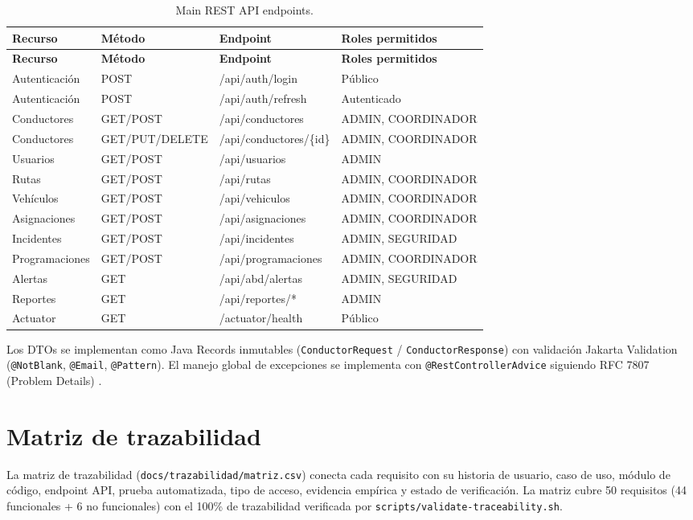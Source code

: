 \begin{longtable}{@{}p{3.5cm}p{2cm}p{2.5cm}p{2.5cm}@{}}
\caption{Main REST API endpoints.}
\label{tab:api-rest}\\
\toprule
\textbf{Recurso} & \textbf{Método} & \textbf{Endpoint} & \textbf{Roles permitidos} \\
\midrule
\endfirsthead
\toprule
\textbf{Recurso} & \textbf{Método} & \textbf{Endpoint} & \textbf{Roles permitidos} \\
\midrule
\endhead
Autenticación & POST & /api/auth/login & Público \\
Autenticación & POST & /api/auth/refresh & Autenticado \\
Conductores & GET/POST & /api/conductores & ADMIN, COORDINADOR \\
Conductores & GET/PUT/DELETE & /api/conductores/\{id\} & ADMIN, COORDINADOR \\
Usuarios & GET/POST & /api/usuarios & ADMIN \\
Rutas & GET/POST & /api/rutas & ADMIN, COORDINADOR \\
Vehículos & GET/POST & /api/vehiculos & ADMIN, COORDINADOR \\
Asignaciones & GET/POST & /api/asignaciones & ADMIN, COORDINADOR \\
Incidentes & GET/POST & /api/incidentes & ADMIN, SEGURIDAD \\
Programaciones & GET/POST & /api/programaciones & ADMIN, COORDINADOR \\
Alertas & GET & /api/abd/alertas & ADMIN, SEGURIDAD \\
Reportes & GET & /api/reportes/* & ADMIN \\
Actuator & GET & /actuator/health & Público \\
\bottomrule
\end{longtable}

Los DTOs se implementan como Java Records inmutables (\texttt{ConductorRequest} / \texttt{ConductorResponse}) con validación Jakarta Validation (\texttt{@NotBlank}, \texttt{@Email}, \texttt{@Pattern}). El manejo global de excepciones se implementa con \texttt{@RestControllerAdvice} siguiendo RFC 7807 (Problem Details) \cite{rfc7807}.

\section{Matriz de trazabilidad}
\label{sec:matriz-trazabilidad}

La matriz de trazabilidad (\texttt{docs/trazabilidad/matriz.csv}) conecta cada requisito con su historia de usuario, caso de uso, módulo de código, endpoint API, prueba automatizada, tipo de acceso, evidencia empírica y estado de verificación. La matriz cubre 50 requisitos (44 funcionales + 6 no funcionales) con el 100\% de trazabilidad verificada por \texttt{scripts/validate-traceability.sh}.

